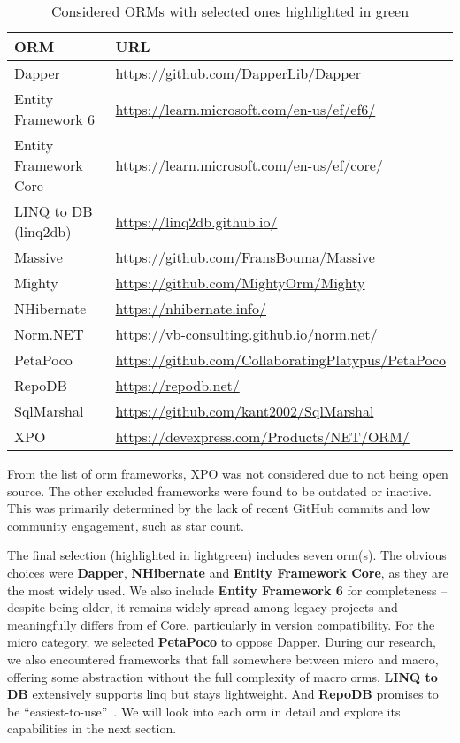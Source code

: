 \begin{table}[ht!]
\footnotesize
\def\arraystretch{1.25}
\centering
\begin{tabular}{ll}
\toprule
\textbf{ORM} & \textbf{URL} \\
\midrule
\cellcolor{lightgreen}Dapper & \url{https://github.com/DapperLib/Dapper} \\
\cellcolor{lightgreen}Entity Framework 6 & \url{https://learn.microsoft.com/en-us/ef/ef6/} \\
\cellcolor{lightgreen}Entity Framework Core & \url{https://learn.microsoft.com/en-us/ef/core/} \\
\cellcolor{lightgreen}LINQ to DB (linq2db) & \url{https://linq2db.github.io/} \\
Massive & \url{https://github.com/FransBouma/Massive} \\
Mighty & \url{https://github.com/MightyOrm/Mighty} \\
\cellcolor{lightgreen}NHibernate & \url{https://nhibernate.info/} \\
Norm.NET & \url{https://vb-consulting.github.io/norm.net/} \\
\cellcolor{lightgreen}PetaPoco & \url{https://github.com/CollaboratingPlatypus/PetaPoco} \\
\cellcolor{lightgreen}RepoDB & \url{https://repodb.net/} \\
SqlMarshal & \url{https://github.com/kant2002/SqlMarshal} \\
XPO & \url{https://devexpress.com/Products/NET/ORM/} \\
\bottomrule
\end{tabular}
\caption{Considered ORMs with selected ones highlighted in green\label{tab:orm-docs}}
\end{table}

From the list of \acrshort{orm} frameworks, XPO was not considered due to not being open source. The other excluded frameworks were found to be outdated or inactive. This was primarily determined by the lack of recent GitHub commits and low community engagement, such as star count. 

The final selection (highlighted in lightgreen) includes seven \acrshort{orm}(s). The obvious choices were \textbf{Dapper}, \textbf{NHibernate} and \textbf{Entity Framework Core}, as they are the most widely used. We also include \textbf{Entity Framework 6} for completeness -- despite being older, it remains widely spread among legacy projects and meaningfully differs from \acrshort{ef} Core, particularly in version compatibility. For the micro category, we selected \textbf{PetaPoco} to oppose Dapper. During our research, we also encountered frameworks that fall somewhere between micro and macro, offering some abstraction without the full complexity of macro \acrshort{orm}s. \textbf{LINQ to DB} extensively supports \acrshort{linq} but stays lightweight. And \textbf{RepoDB} promises to be ``easiest-to-use''~\cite{RepoDB}. We will look into each \acrshort{orm} in detail and explore its capabilities in the next section.